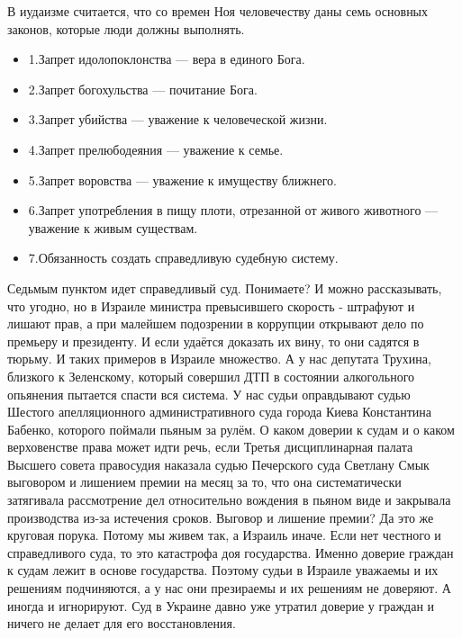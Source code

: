 В иудаизме считается, что со времен Ноя человечеству даны семь основных
законов, которые люди должны выполнять.  

\begin{itemize}
  \item 1.Запрет идолопоклонства — вера в единого Бога.
  \item 2.Запрет богохульства — почитание Бога.
  \item 3.Запрет убийства — уважение к человеческой жизни.
  \item 4.Запрет прелюбодеяния — уважение к семье.
  \item 5.Запрет воровства — уважение к имуществу ближнего.
  \item 6.Запрет употребления в пищу плоти, отрезанной от живого животного — уважение к живым существам.
  \item 7.Обязанность создать справедливую судебную систему.
\end{itemize}

Седьмым пунктом идет справедливый суд. Понимаете? И можно рассказывать, что
угодно, но в Израиле министра превысившего скорость - штрафуют и лишают прав, а
при малейшем подозрении в коррупции открывают дело по премьеру и президенту. И
если удаётся доказать их вину, то они садятся в тюрьму. И таких примеров в
Израиле множество. А у нас депутата Трухина, близкого к Зеленскому, который
совершил ДТП в состоянии алкогольного опьянения пытается спасти вся система. У
нас судьи оправдывают судью Шестого апелляционного административного суда
города Киева Константина Бабенко, которого поймали пьяным за рулём. О каком
доверии к судам и о каком верховенстве права может идти речь, если Третья
дисциплинарная палата Высшего совета правосудия наказала судью Печерского суда
Светлану Смык выговором и лишением премии на месяц за то, что она
систематически затягивала рассмотрение дел относительно вождения в пьяном виде
и закрывала производства из-за истечения сроков. Выговор и лишение премии? Да
это же круговая порука. Потому мы живем так, а Израиль иначе. Если нет честного
и справедливого суда, то это катастрофа доя государства. Именно доверие граждан
к судам лежит в основе государства. Поэтому судьи в Израиле уважаемы и их
решениям подчиняются, а у нас они презираемы и их решениям не доверяют. А
иногда и игнорируют. Суд в Украине давно уже утратил доверие у граждан и ничего
не делает для его восстановления. 


